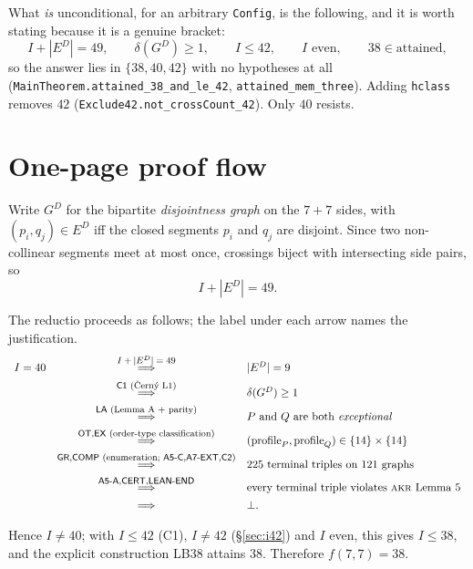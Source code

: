 \documentclass[11pt,a4paper]{article}
\theoremstyle{plain}
\theoremstyle{definition}
\theoremstyle{remark}
\newcommand{\GD}{G^{D}}
\newcommand{\ED}{E^{D}}
\begin{document}
What \emph{is} unconditional, for an arbitrary \texttt{Config}, is the
following, and it is worth stating because it is a genuine bracket:
\[
  I+|\ED| = 49, \qquad \delta(\GD)\ge1, \qquad I\le42, \qquad I \text{ even},
  \qquad 38 \in \text{attained},
\]
so the answer lies in $\{38,40,42\}$ with no hypotheses at all
(\texttt{MainTheorem.attained\_38\_and\_le\_42},
\texttt{attained\_mem\_three}). Adding \texttt{hclass} removes $42$
(\texttt{Exclude42.not\_crossCount\_42}). Only $40$ resists.

\section{One-page proof flow}\label{sec:flow}

Write $\GD$ for the bipartite \emph{disjointness graph} on the $7+7$ sides, with
$(p_i,q_j)\in\ED$ iff the closed segments $p_i$ and $q_j$ are disjoint. Since two
non-collinear segments meet at most once, crossings biject with intersecting side
pairs, so
\[
  I + |\ED| = 49 .
\]

The reductio proceeds as follows; the label under each arrow names the
justification.
{\small\[
\begin{array}{rcl}
  I=40
  &\stackrel{\text{\footnotesize $I+|\ED|=49$}}{\Longrightarrow}&
  |\ED| = 9 \\[4pt]
  &\stackrel{\text{\footnotesize \textsf{C1} ({\v C}ern{\'y} L1)}}{\Longrightarrow}&
  \delta(\GD)\ge 1 \\[4pt]
  &\stackrel{\text{\footnotesize \textsf{LA} (Lemma A + parity)}}{\Longrightarrow}&
  P \text{ and } Q \text{ are both \emph{exceptional}} \\[4pt]
  &\stackrel{\text{\footnotesize \textsf{OT},\textsf{EX} (order-type classification)}}{\Longrightarrow}&
  (\text{profile}_P,\text{profile}_Q) \in \{14\}\times\{14\} \\[4pt]
  &\stackrel{\text{\footnotesize \textsf{GR},\textsf{COMP} (enumeration; \textsf{A5-C},\textsf{A7-EXT},\textsf{C2})}}{\Longrightarrow}&
  225 \text{ terminal triples on } 121 \text{ graphs} \\[4pt]
  &\stackrel{\text{\footnotesize \textsf{A5-A},\textsf{CERT},\textsf{LEAN-END}}}{\Longrightarrow}&
  \text{every terminal triple violates \textsc{akr} Lemma 5} \\[4pt]
  &\Longrightarrow& \bot .
\end{array}
\]}

Hence $I\neq 40$; with $I\le42$ (\textsf{C1}), $I\neq42$ (\S\ref{sec:i42}) and
$I$ even, this gives $I\le 38$, and the explicit construction \textsf{LB38}
attains $38$. Therefore $f(7,7)=38$.
\end{document}
